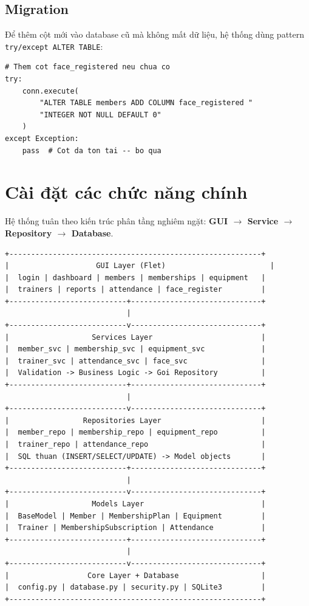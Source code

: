 \documentclass[12pt,a4paper]{article}
\begin{document}
\subsection{Migration}

Để thêm cột mới vào database cũ mà không mất dữ liệu, hệ thống dùng pattern \texttt{try/except ALTER TABLE}:

\begin{lstlisting}[style=pythonstyle, caption={Migration thêm cột}]
# Them cot face_registered neu chua co
try:
    conn.execute(
        "ALTER TABLE members ADD COLUMN face_registered "
        "INTEGER NOT NULL DEFAULT 0"
    )
except Exception:
    pass  # Cot da ton tai -- bo qua
\end{lstlisting}

\section{Cài đặt các chức năng chính}

Hệ thống tuân theo kiến trúc phân tầng nghiêm ngặt: \textbf{GUI $\rightarrow$ Service $\rightarrow$ Repository $\rightarrow$ Database}.

\begin{verbatim}
+----------------------------------------------------------+
|                    GUI Layer (Flet)                        |
|  login | dashboard | members | memberships | equipment   |
|  trainers | reports | attendance | face_register         |
+---------------------------+------------------------------+
                            |
+---------------------------v------------------------------+
|                   Services Layer                         |
|  member_svc | membership_svc | equipment_svc             |
|  trainer_svc | attendance_svc | face_svc                 |
|  Validation -> Business Logic -> Goi Repository          |
+---------------------------+------------------------------+
                            |
+---------------------------v------------------------------+
|                 Repositories Layer                       |
|  member_repo | membership_repo | equipment_repo          |
|  trainer_repo | attendance_repo                          |
|  SQL thuan (INSERT/SELECT/UPDATE) -> Model objects       |
+---------------------------+------------------------------+
                            |
+---------------------------v------------------------------+
|                   Models Layer                           |
|  BaseModel | Member | MembershipPlan | Equipment         |
|  Trainer | MembershipSubscription | Attendance           |
+---------------------------+------------------------------+
                            |
+---------------------------v------------------------------+
|                  Core Layer + Database                   |
|  config.py | database.py | security.py | SQLite3         |
+----------------------------------------------------------+
\end{verbatim}
\end{document}
